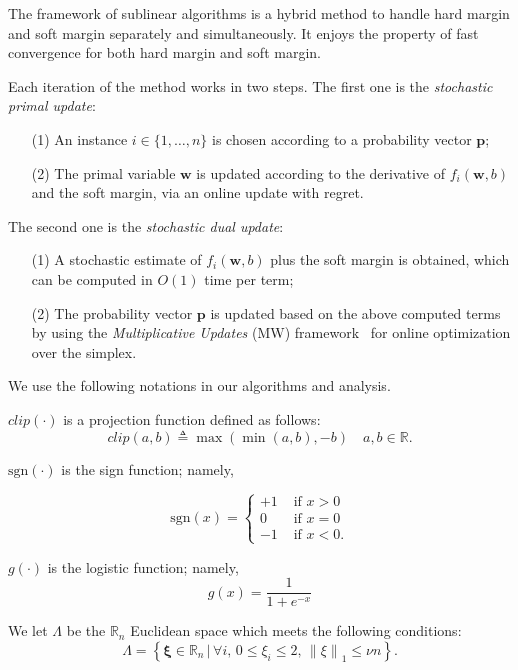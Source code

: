 \documentclass{llncs}
\newcommand{\bw}{\mathbf{w}}
\newcommand{\bp}{\mathbf{p}}
\newcommand{\bxi}{\mathbf{\xi}}
\newcommand{\lc}{\left(}
\newcommand{\rc}{\right)}
\def\sgn{\mathrm{sgn}}
\begin{document}
The framework of sublinear algorithms is a hybrid method to handle hard margin and soft margin separately and simultaneously.
It enjoys the property of fast convergence for both hard margin and soft margin.

Each iteration of the method works in two steps.
The first one is the \textit{stochastic primal update}:
\begin{enumerate}
\item[{(1)}] \; An instance $i\in \{1,\ldots, n\}$ is chosen according to a probability vector $\bp$;
\item[{(2)}] \; The primal variable $\bw$ is updated according to the derivative of $f_i(\bw,b)$ and the soft margin, via an online update with regret.
\end{enumerate}

The second one is the \textit{stochastic dual update}:
\begin{enumerate}
\item[{(1)}] \; A stochastic estimate of $f_i(\bw,b)$ plus the soft margin is obtained, which can be computed in $O(1)$ time per term;
\item[{(2)}] \; The probability vector $\bp$ is updated based on the above computed terms by using the \textit{Multiplicative Updates} (MW) framework~\cite{arora2005multiplicative} for online optimization over the simplex.
\end{enumerate}

We use the following notations in our algorithms and analysis.

$clip\lc \cdot \rc$ is a projection function defined as follows:
	\[
	clip\lc a,b \rc \triangleq \max \lc \min \lc a,b \rc ,-b\rc \,\,\,\,\,\, a,b \in \mathbb{R}.
	\]

$\sgn \lc \cdot \rc$ is the sign function; namely,
	
	\[
	\sgn \lc x \rc =
		\begin{cases}
 		+1 & \text{ if } x>0  \\
 		0  & \text{ if } x=0  \\
 		-1 & \text{ if } x<0.
		\end{cases}
	\]

$g\lc \cdot \rc$ is the logistic function; namely,
	\[
	g \lc x \rc=\frac{1}{1+e^{-x}}
	\]

We let $\Lambda$ be the $\mathbb{R}_{n}$ Euclidean space which meets the following conditions:
	\[
	\Lambda=\left\{ \bxi\in\mathbb{R}_{n} \, | \, \forall i, \, 0\leq{\xi}_{i}\leq 2, \, {\|\xi \|}_{1}\leq \nu n  \right
	\}.
	\]
\end{document}
